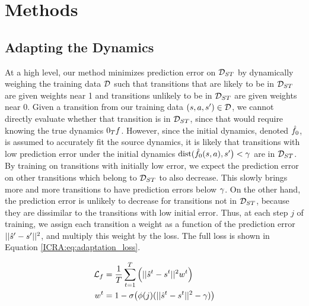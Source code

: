 \section{Methods} \label{ICRA:sec:methods}

\subsection{Adapting the Dynamics} \label{ICRA:sec:adaptation}

At a high level, our method minimizes prediction error on $\mathcal{D}_{ST}$ by dynamically weighing the training data $\mathcal{D}$ such that transitions that are likely to be in $\mathcal{D}_{ST}$ are given weights near 1 and transitions unlikely to be in $\mathcal{D}_{ST}$ are given weights near 0. Given a transition from our training data $(s,a,s')\in\mathcal{D}$, we cannot directly evaluate whether that transition is in $\mathcal{D}_{ST}$, since that would require knowing the true dynamics $\targetDynamics$. However, since the initial dynamics, denoted $\hat{f}_0$, is assumed to accurately fit the source dynamics, it is likely that transitions with low prediction error under the initial dynamics $\mathrm{dist}(\hat{f}_0(s,a),s'\big) < \gamma$ are in $\mathcal{D}_{ST}$. By training on transitions with initially low error, we expect the prediction error on other transitions which belong to $\mathcal{D}_{ST}$ to also decrease. This slowly brings more and more transitions to have prediction errors below $\gamma$. On the other hand, the prediction error is unlikely to decrease for transitions not in $\mathcal{D}_{ST}$, because they are dissimilar to the transitions with low initial error. Thus, at each step $j$ of training, we assign each transition a weight as a function of the prediction error $||\hat{s}'-s'||^2$, and multiply this weight by the loss. The full loss is shown in Equation \eqref{ICRA:eq:adaptation_loss}.

\begin{equation}
    \label{ICRA:eq:adaptation_loss}
    \begin{split}
    \mathcal{L}_f &= \frac{1}{T}\sum_{t=1}^T\Big(||\hat{s}^{t}-s^{t}||^2 w^t\Big) \\
    w^t &= 1 - \sigma\big(\phi(j)(||\hat{s}^{t}-s^{t}||^2 - \gamma)\big)
    \end{split}
\end{equation}

